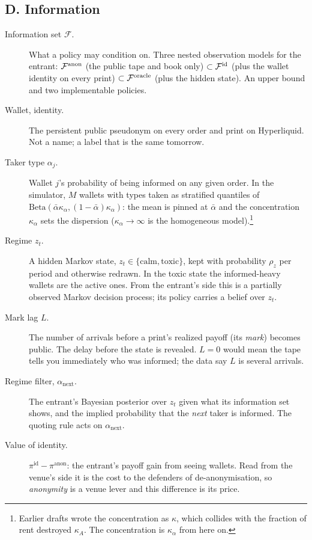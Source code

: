 \subsection*{D. Information}
\begin{description}
\item[Information set $\mathcal{F}$.] What a policy may condition on. Three nested observation models for the entrant: $\mathcal{F}^{\mathrm{anon}}$ (the public tape and book only) $\subset\mathcal{F}^{\mathrm{id}}$ (plus the wallet identity on every print) $\subset\mathcal{F}^{\mathrm{oracle}}$ (plus the hidden state). An upper bound and two implementable policies.
\item[Wallet, identity.] The persistent public pseudonym on every order and print on Hyperliquid. Not a name; a label that is the same tomorrow.
\item[Taker type $\alpha_j$.] Wallet $j$'s probability of being informed on any given order. In the simulator, $M$ wallets with types taken as stratified quantiles of $\mathrm{Beta}(\bar\alpha\kappa_\alpha,(1-\bar\alpha)\kappa_\alpha)$: the mean is pinned at $\bar\alpha$ and the concentration $\kappa_\alpha$ sets the dispersion ($\kappa_\alpha\to\infty$ is the homogeneous model).\footnote{Earlier drafts wrote the concentration as $\kappa$, which collides with the fraction of rent destroyed $\kappa_A$. The concentration is $\kappa_\alpha$ from here on.}
\item[Regime $z_t$.] A hidden Markov state, $z_t\in\{\text{calm},\text{toxic}\}$, kept with probability $\rho_z$ per period and otherwise redrawn. In the toxic state the informed-heavy wallets are the active ones. From the entrant's side this is a partially observed Markov decision process; its policy carries a belief over $z_t$.
\item[Mark lag $L$.] The number of arrivals before a print's realized payoff (its \emph{mark}) becomes public. The delay before the state is revealed. $L=0$ would mean the tape tells you immediately who was informed; the data say $L$ is several arrivals.
\item[Regime filter, $\alpha_{\mathrm{next}}$.] The entrant's Bayesian posterior over $z_t$ given what its information set shows, and the implied probability that the \emph{next} taker is informed. The quoting rule acts on $\alpha_{\mathrm{next}}$.
\item[Value of identity.] $\pi^{\mathrm{id}}-\pi^{\mathrm{anon}}$: the entrant's payoff gain from seeing wallets. Read from the venue's side it is the cost to the defenders of de-anonymisation, so \emph{anonymity} is a venue lever and this difference is its price.
\end{description}


